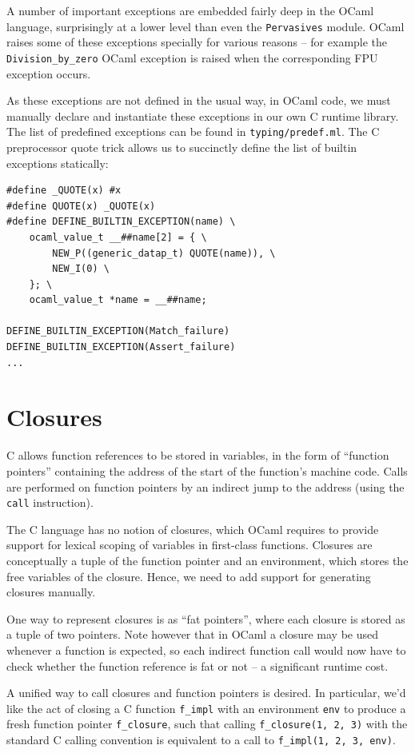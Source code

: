 \documentclass[12pt,a4paper,twoside,openright]{report}
\begin{document}
A number of important exceptions are embedded fairly deep in the OCaml
language, surprisingly at a lower level than even the \lstinline!Pervasives!
module. OCaml raises some of these exceptions specially for various reasons --
for example the \lstinline!Division_by_zero! OCaml exception is raised when the
corresponding FPU exception occurs.

As these exceptions are not defined in the usual way, in OCaml code, we must
manually declare and instantiate these exceptions in our own C runtime library.
The list of predefined exceptions can be found in \lstinline!typing/predef.ml!.
The C preprocessor quote trick allows us to succinctly define the list of
builtin exceptions statically:

\begin{lstlisting}
#define _QUOTE(x) #x
#define QUOTE(x) _QUOTE(x)
#define DEFINE_BUILTIN_EXCEPTION(name) \
    ocaml_value_t __##name[2] = { \
        NEW_P((generic_datap_t) QUOTE(name)), \
        NEW_I(0) \
    }; \
    ocaml_value_t *name = __##name;

DEFINE_BUILTIN_EXCEPTION(Match_failure)
DEFINE_BUILTIN_EXCEPTION(Assert_failure)
...
\end{lstlisting}

\section{Closures}\label{closures}

C allows function references to be stored in variables, in the form of
``function pointers'' containing the address of the start of the function's
machine code. Calls are performed on function pointers by an indirect jump to
the address (using the \lstinline!call! instruction).

The C language has no notion of closures, which OCaml requires to provide
support for lexical scoping of variables in first-class functions. Closures are
conceptually a tuple of the function pointer and an environment, which stores
the free variables of the closure. Hence, we need to add support for generating
closures manually.

One way to represent closures is as ``fat pointers'', where each closure is
stored as a tuple of two pointers. Note however that in OCaml a closure may be
used whenever a function is expected, so each indirect function call would now
have to check whether the function reference is fat or not -- a significant
runtime cost.

A unified way to call closures and function pointers is desired. In
particular, we'd like the act of closing a C function \lstinline!f_impl! with
an environment \lstinline!env! to produce a fresh function pointer
\lstinline!f_closure!, such that calling
\lstinline!f_closure(1, 2, 3)!
with the standard C calling convention is equivalent to a call to
\lstinline!f_impl(1, 2, 3, env)!.
\end{document}

